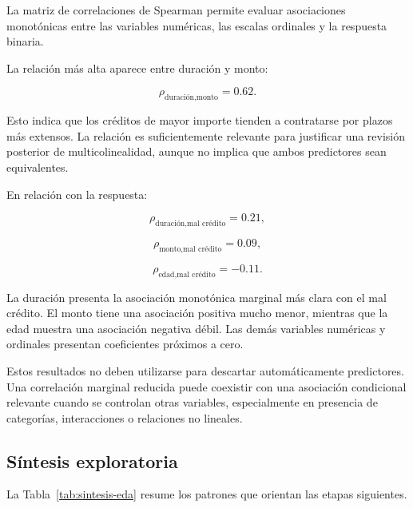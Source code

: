 La matriz de correlaciones de Spearman permite evaluar asociaciones
monotónicas entre las variables numéricas, las escalas ordinales y la
respuesta binaria.

La relación más alta aparece entre duración y monto:

\[
\rho_{\text{duración,monto}}=0.62.
\]

Esto indica que los créditos de mayor importe tienden a contratarse por
plazos más extensos. La relación es suficientemente relevante para
justificar una revisión posterior de multicolinealidad, aunque no implica
que ambos predictores sean equivalentes.

En relación con la respuesta:

\[
\rho_{\text{duración,mal crédito}}=0.21,
\]

\[
\rho_{\text{monto,mal crédito}}=0.09,
\]

\[
\rho_{\text{edad,mal crédito}}=-0.11.
\]

La duración presenta la asociación monotónica marginal más clara con el
mal crédito. El monto tiene una asociación positiva mucho menor, mientras
que la edad muestra una asociación negativa débil. Las demás variables
numéricas y ordinales presentan coeficientes próximos a cero.

Estos resultados no deben utilizarse para descartar automáticamente
predictores. Una correlación marginal reducida puede coexistir con una
asociación condicional relevante cuando se controlan otras variables,
especialmente en presencia de categorías, interacciones o relaciones no
lineales.

\subsection{Síntesis exploratoria}

La Tabla~\ref{tab:sintesis-eda} resume los patrones que orientan las
etapas siguientes.

